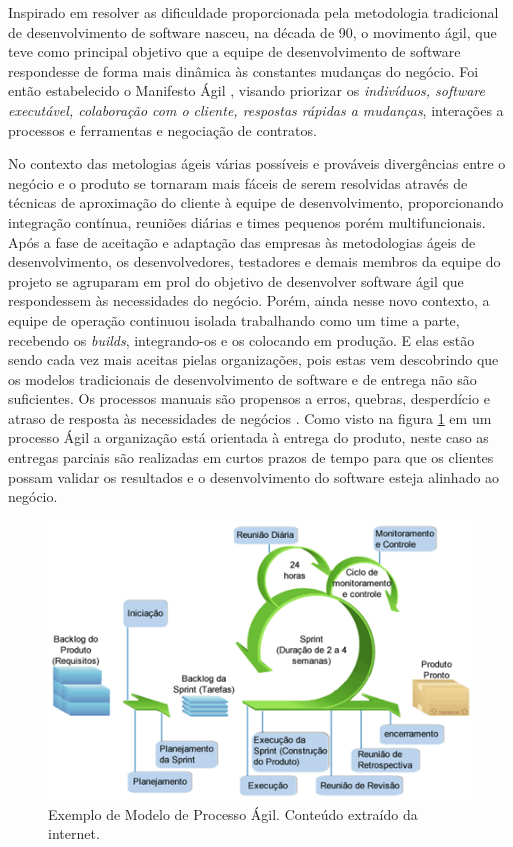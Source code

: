 Inspirado em resolver as dificuldade proporcionada pela metodologia tradicional de desenvolvimento de software nasceu, na década de 90, o movimento ágil, que teve como principal objetivo que a equipe de desenvolvimento de software respondesse de forma mais dinâmica às constantes mudanças do negócio. Foi então estabelecido o Manifesto Ágil \cite{Beck2001}, visando priorizar os \textit{indivíduos, software executável, colaboração com o cliente, respostas rápidas a mudanças}, interações a processos e ferramentas e negociação de contratos.

No contexto das metologias ágeis várias possíveis e prováveis divergências entre o negócio e o produto se tornaram mais fáceis de serem resolvidas através de técnicas de aproximação do cliente à equipe de desenvolvimento, proporcionando integração contínua, reuniões diárias e times pequenos porém multifuncionais. Após a fase de aceitação e adaptação das empresas às metodologias ágeis de desenvolvimento, os desenvolvedores, testadores e demais membros da equipe do projeto se agruparam em prol do objetivo de desenvolver software ágil que respondessem às necessidades do negócio. Porém, ainda nesse novo contexto, a equipe de operação continuou isolada trabalhando como um time a parte, recebendo os \textit{builds}, integrando-os e os colocando em produção. E elas estão sendo cada vez mais aceitas pielas organizações, pois estas vem descobrindo que os modelos tradicionais de desenvolvimento de software e de entrega não são suficientes. Os processos manuais são propensos a erros, quebras, desperdício e atraso de resposta às necessidades de negócios \cite{WOOTTON2013}. Como visto na figura \ref{fig:figure23} em um processo Ágil a organização está orientada à entrega do produto, neste caso as entregas parciais são realizadas em curtos prazos de tempo para que os clientes possam validar os resultados e o desenvolvimento do software esteja alinhado ao negócio.


\begin{figure}[!ht]
\centering
\includegraphics[width=.75\textwidth]{fig/figura23.png}
\caption{Exemplo de Modelo de Processo Ágil. Conteúdo extraído da internet.}
\label{fig:figure23}
\end{figure}

